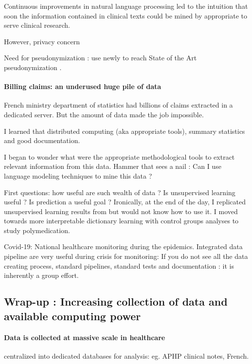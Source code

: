 \documentclass{report}
\begin{document}
Continuous improvements in natural language processing led to the intuition that
soon the information contained in clinical texts could be mined by appropriate
to serve clinical research.

However, privacy concern

Need for pseudonymization : use newly to reach State of the Art pseudonymization
\citep{dernoncourt2017identification, paris2019desidentification}.

\paragraph{Billing claims: an underused huge pile of data}

French ministry department of statistics had billions of claims extracted in a
dedicated server. But the amount of data made the job impossible.

I learned that distributed computing (aka appropriate tools), summary statistics
and good documentation.

I began to wonder what were the appropriate methodological tools to extract
relevant information from this data. Hammer that sees a nail : Can I use language
modeling techniques to mine this data ?

First questions: how useful are such wealth of data ? Is unsupervised learning
useful ? Is prediction a useful goal ? Ironically, at the end of the day, I
replicated unsupervised learning results from \citep{beam2019clinical} but would
not know how to use it. I moved towards more interpretable dictionary learning
with control groups analyses to study polymedication.

Covid-19: National healthcare monitoring during the epidemics. Integrated data
pipeline are very useful during crisis for monitoring: If you do not see all the
data creating process, standard pipelines, standard tests and documentation : it
is inherently a group effort.

\subsection{Wrap-up : Increasing collection of data and available computing power}

\paragraph{Data is collected at massive scale in healthcare} centralized
into dedicated databases for analysis: eg. APHP clinical notes, French.
\end{document}
